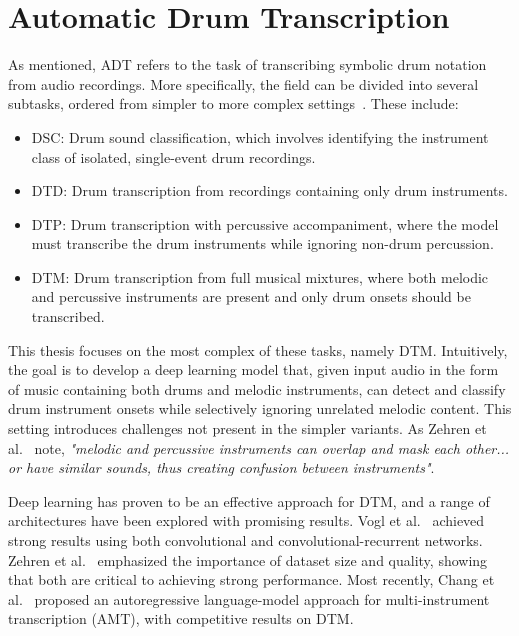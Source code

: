 \section{Automatic Drum Transcription}

As mentioned, \acrfull{ADT} refers to the task of transcribing symbolic drum notation from audio recordings. More specifically, the field can be divided into several subtasks, ordered from simpler to more complex settings~\cite{8350302}. These include:
\begin{itemize}
    \item \acrshort{DSC}: Drum sound classification, which involves identifying the instrument class of isolated, single-event drum recordings.
    \item \acrshort{DTD}: Drum transcription from recordings containing only drum instruments.
    \item \acrshort{DTP}: Drum transcription with percussive accompaniment, where the model must transcribe the drum instruments while ignoring non-drum percussion.
    \item \acrshort{DTM}: Drum transcription from full musical mixtures, where both melodic and percussive instruments are present and only drum onsets should be transcribed.
\end{itemize}

This thesis focuses on the most complex of these tasks, namely \acrfull{DTM}. Intuitively, the goal is to develop a deep learning model that, given input audio in the form of music containing both drums and melodic instruments, can detect and classify drum instrument onsets while selectively ignoring unrelated melodic content. This setting introduces challenges not present in the simpler variants. As Zehren et al.~\cite{signals4040042} note, \textit{"melodic and percussive instruments can overlap and mask each other... or have similar sounds, thus creating confusion between instruments"}.

Deep learning has proven to be an effective approach for \gls{DTM}, and a range of architectures have been explored with promising results. Vogl et al.~\cite{Vogl2017DrumTV, vogl2018multiinstrumentdrumtranscription} achieved strong results using both convolutional and convolutional-recurrent networks. Zehren et al.~\cite{signals4040042, zehren2024analyzingreducingsynthetictorealtransfer} emphasized the importance of dataset size and quality, showing that both are critical to achieving strong performance. Most recently, Chang et al.~\cite{chang2024yourmt3+} proposed an autoregressive language-model approach for multi-instrument transcription (\gls{AMT}), with competitive results on \gls{DTM}.

